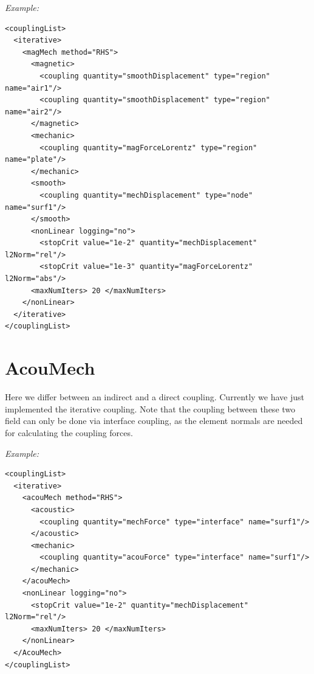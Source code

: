 \bigskip
\noindent
{\it Example:}

\begin{verbatim}
<couplingList>
  <iterative>
    <magMech method="RHS">
      <magnetic>
        <coupling quantity="smoothDisplacement" type="region" name="air1"/>
        <coupling quantity="smoothDisplacement" type="region" name="air2"/>
      </magnetic>
      <mechanic>
        <coupling quantity="magForceLorentz" type="region" name="plate"/>
      </mechanic>
      <smooth>
        <coupling quantity="mechDisplacement" type="node" name="surf1"/>
      </smooth>
      <nonLinear logging="no">
        <stopCrit value="1e-2" quantity="mechDisplacement" l2Norm="rel"/>
        <stopCrit value="1e-3" quantity="magForceLorentz" l2Norm="abs"/>
      <maxNumIters> 20 </maxNumIters>
    </nonLinear>
  </iterative>
</couplingList>
\end{verbatim}


\section{AcouMech}
Here we differ between an indirect and a direct coupling. Currently we have
just implemented the iterative coupling. Note that the coupling
between these two field can only be done via {\sf interface} coupling,
as the element normals are needed for calculating the coupling forces.

\bigskip
\noindent
{\it Example:}

\begin{verbatim}
<couplingList>
  <iterative>
    <acouMech method="RHS">
      <acoustic>
        <coupling quantity="mechForce" type="interface" name="surf1"/>
      </acoustic>
      <mechanic>
        <coupling quantity="acouForce" type="interface" name="surf1"/>
      </mechanic>
    </acouMech>
    <nonLinear logging="no">
      <stopCrit value="1e-2" quantity="mechDisplacement" l2Norm="rel"/>
      <maxNumIters> 20 </maxNumIters>
    </nonLinear>
  </AcouMech>
</couplingList>
\end{verbatim}
